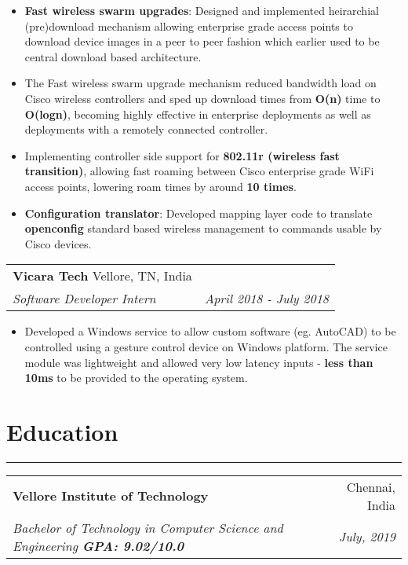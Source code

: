 \documentclass[a4paper,6pt]{article}
\begin{document}
\small
\begin{itemize}
	\itemsep0em
	\item \textcolor{mygray}{\textbf{Fast wireless swarm upgrades}}: Designed and implemented heirarchial (pre)download mechanism allowing enterprise grade access points to download device images in a peer to peer fashion which earlier used to be central download based architecture. 
        \item The Fast wireless swarm upgrade mechanism reduced bandwidth load on Cisco wireless controllers and sped up download times from \textcolor{mygray}{\textbf{O(n)}} time to \textcolor{mygray}{\textbf{O(logn)}}, becoming highly effective in enterprise deployments as well as deployments with a remotely connected controller.
	\item  Implementing controller side support for \textcolor{mygray}{\textbf{802.11r (wireless fast transition)}}, allowing fast roaming between Cisco enterprise grade WiFi access points, lowering roam times by around \textcolor{mygray}{\textbf{10 times}}.
    \item \textcolor{mygray}{\textbf{Configuration translator}}: Developed mapping layer code to translate \textcolor{mygray}{\textbf{openconfig}} standard based wireless management to commands usable by Cisco devices. 
\end{itemize}

\vspace{6px}
\hspace{5px}
\begin{tabularx}{\textwidth}{X r}
	\large{\textbf{Vicara Tech}} \small Vellore, TN, India& \\
	\textit{\small Software Developer Intern}& \textit{April 2018 - July 2018} \\
\end{tabularx}

\small
\begin{itemize}
	\itemsep0em
	\item Developed a Windows service to allow custom software (eg. AutoCAD) to be controlled using a gesture control device on Windows platform. The service module was lightweight and allowed very low latency inputs - \textcolor{mygray}{\textbf{less than 10ms}} to be provided to the operating system.
\end{itemize}
\normalsize


\section*{Education}
\vspace{-8px}
\hrule
\vspace{4px}
\hspace{5px}
\begin{tabularx}{\textwidth}{X r}
	\textbf{Vellore Institute of Technology} & Chennai, India \\
	\textit{\small Bachelor of Technology in Computer Science and Engineering \textcolor{mygray}{\textbf{GPA: 9.02/10.0}}} & \textit{July, 2019} 
\end{tabularx}
\end{document}
